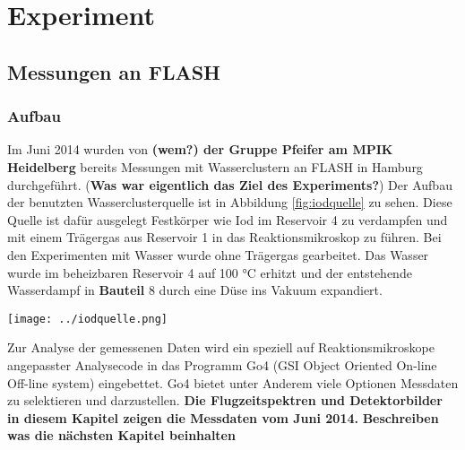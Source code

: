 \chapter{Experiment} 

\section{Messungen an FLASH}

\subsection{Aufbau}

Im Juni 2014 wurden von \textbf{(wem?) der Gruppe Pfeifer am MPIK Heidelberg} bereits Messungen mit Wasserclustern an FLASH in Hamburg durchgeführt. (\textbf{Was war eigentlich das Ziel des Experiments?}) Der Aufbau der benutzten Wasserclusterquelle ist in Abbildung \ref{fig:iodquelle} zu sehen. Diese Quelle ist dafür ausgelegt Festkörper wie Iod im Reservoir 4 zu verdampfen und mit einem Trägergas aus Reservoir 1 in das Reaktionsmikroskop zu führen. Bei den Experimenten mit Wasser wurde ohne Trägergas gearbeitet. Das Wasser wurde im beheizbaren Reservoir 4 auf 100 °C erhitzt und der entstehende Wasserdampf in \textbf{Bauteil} 8 durch eine Düse ins Vakuum expandiert.

\begin{center}
\begin{minipage}{\linewidth}
\centering
\texttt{[image: ../iodquelle.png]}%
 \label{fig:iodquelle}
\end{minipage} 
\end{center} 

Zur Analyse der gemessenen Daten wird ein speziell auf Reaktionsmikroskope angepasster Analysecode in das Programm Go4 (GSI Object Oriented On-line Off-line system) eingebettet. Go4 bietet unter Anderem viele Optionen Messdaten zu selektieren und darzustellen. \textbf{Die Flugzeitspektren und Detektorbilder in diesem Kapitel zeigen die Messdaten vom Juni 2014.}
\textbf{Beschreiben was die nächsten Kapitel beinhalten}

